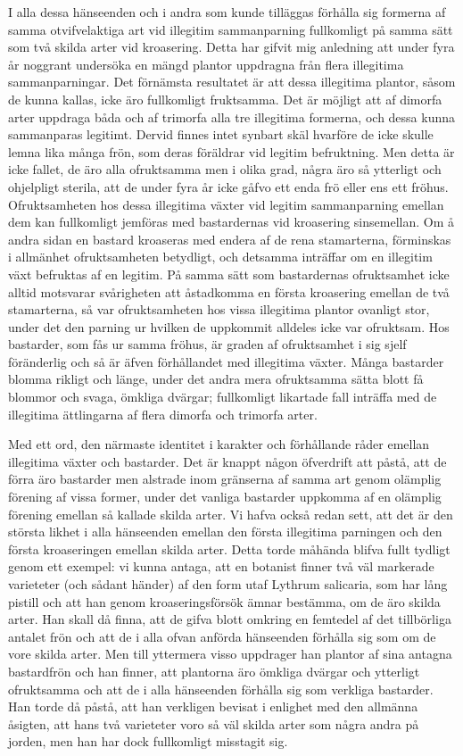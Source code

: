 I alla dessa hänseenden och i andra som kunde tilläggas förhålla sig formerna af samma otvifvelaktiga art vid illegitim sammanparning fullkomligt på samma sätt som två skilda arter vid kroasering. Detta har gifvit mig anledning att under fyra år noggrant undersöka en mängd plantor uppdragna från flera illegitima sammanparningar. Det förnämsta resultatet är att dessa illegitima plantor, såsom de kunna kallas, icke äro fullkomligt fruktsamma. Det är möjligt att af dimorfa arter uppdraga båda och af trimorfa alla tre illegitima formerna, och dessa kunna sammanparas legitimt. Dervid finnes intet synbart skäl hvarföre de icke skulle lemna lika många frön, som deras föräldrar vid legitim befruktning. Men detta är icke fallet, de äro alla ofruktsamma men i olika grad, några äro så ytterligt och ohjelpligt sterila, att de under fyra år icke gåfvo ett enda frö eller ens ett fröhus. Ofruktsamheten hos dessa illegitima växter vid legitim sammanparning emellan dem kan fullkomligt jemföras med bastardernas vid kroasering sinsemellan. Om å andra sidan en bastard kroaseras med endera af de rena stamarterna, förminskas i allmänhet ofruktsamheten betydligt, och detsamma inträffar om en illegitim växt befruktas af en legitim. På samma sätt som bastardernas ofruktsamhet icke alltid motsvarar svårigheten att åstadkomma en första kroasering emellan de två stamarterna, så var ofruktsamheten hos vissa illegitima plantor ovanligt stor, under det den parning ur hvilken de uppkommit alldeles icke var ofruktsam. Hos bastarder, som fås ur samma fröhus, är graden af ofruktsamhet i sig sjelf föränderlig och så är äfven förhållandet med illegitima växter. Många bastarder blomma rikligt och länge, under det andra mera ofruktsamma sätta blott få blommor och svaga, ömkliga dvärgar; fullkomligt likartade fall inträffa med de illegitima ättlingarna af flera dimorfa och trimorfa arter.

Med ett ord, den närmaste identitet i karakter och förhållande råder emellan illegitima växter och bastarder. Det är knappt någon öfverdrift att påstå, att de förra äro bastarder men alstrade inom gränserna af samma art genom olämplig förening af vissa former, under det vanliga bastarder uppkomma af en olämplig förening emellan så kallade skilda arter. Vi hafva också redan sett, att det är den största likhet i alla hänseenden emellan den första illegitima parningen och den första kroaseringen emellan skilda arter. Detta torde måhända blifva fullt tydligt genom ett exempel: vi kunna antaga, att en botanist finner två väl markerade varieteter (och sådant händer) af den form utaf Lythrum salicaria, som har lång pistill och att han genom kroaseringsförsök ämnar bestämma, om de äro skilda arter. Han skall då finna, att de gifva blott omkring en femtedel af det tillbörliga antalet frön och att de i alla ofvan anförda hänseenden förhålla sig som om de vore skilda arter. Men till yttermera visso uppdrager han plantor af sina antagna bastardfrön och han finner, att plantorna äro ömkliga dvärgar och ytterligt ofruktsamma och att de i alla hänseenden förhålla sig som verkliga bastarder. Han torde då påstå, att han verkligen bevisat i enlighet med den allmänna åsigten, att hans två varieteter voro så väl skilda arter som några andra på jorden, men han har dock fullkomligt misstagit sig.

